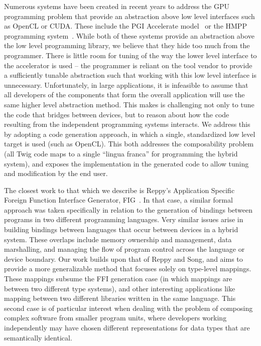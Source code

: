 Numerous systems have been created in recent years to address the GPU
programming problem that provide an abstraction above low level
interfaces such as OpenCL or CUDA.  These include the PGI Accelerate
model~\cite{pgi-accelerate} or the HMPP programming
system~\cite{hmpp}.  While both of these systems provide an
abstraction above the low level programming library, we believe that
they hide too much from the programmer.  There is little room for
tuning of the way the lower level interface to the accelerator is used
-- the programmer is reliant on the tool vendor to provide a
sufficiently tunable abstraction such that working with this low level
interface is unnecessary.  Unfortunately, in large applications, it is
infeasible to assume that all developers of the components that form
the overall application will use the same higher level abstraction
method.  This makes is challenging not only to tune the code that
bridges between devices, but to reason about how the code resulting
from the independent programming systems interacts.  We address this
by adopting a code generation approach, in which a single, standardized
low level target is used (such as OpenCL).  This both addresses the
composability problem (all Twig code maps to a single ``lingua franca''
for programming the hybrid system), and exposes the implementation in
the generated code to allow tuning and modification by the end user.

The closest work to that which we describe is Reppy's Application
Specific Foreign Function Interface Generator,
FIG~\cite{reppy06fig}. In that case, a similar formal approach was
taken specifically in relation to the generation of bindings between
programs in two different programming languages.  Very similar issues
arise in building bindings between languages that occur between
devices in a hybrid system.  These overlaps include memory ownership
and management, data marshalling, and managing the flow of program
control across the language or device boundary.  Our work builds upon
that of Reppy and Song, and aims to provide a more generalizable
method that focuses solely on type-level mappings. These mappings
subsume the FFI generation case (in which mappings are between two
different type systems), and other interesting applications like
mapping between two different libraries written in the same
language. This second case is of particular interest when dealing with
the problem of composing complex software from smaller program units,
where developers working independently may have chosen different
representations for data types that are semantically identical.

